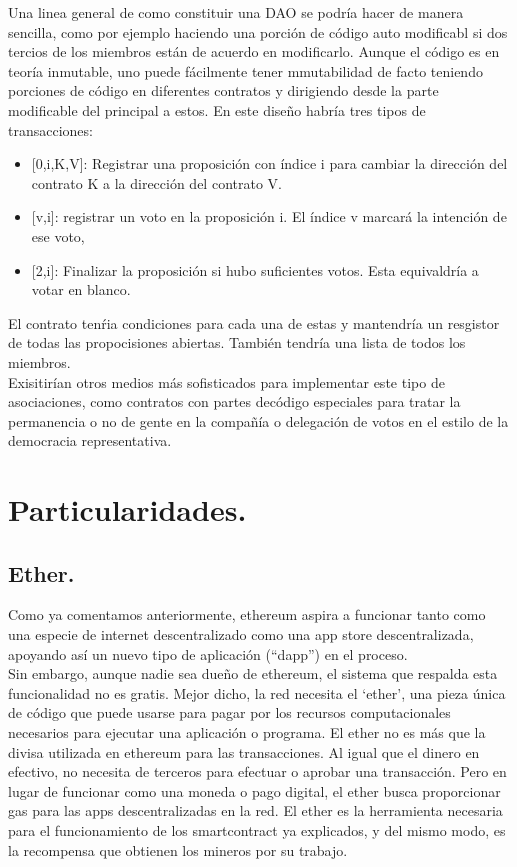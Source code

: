 \documentclass[11pt,a4paper]{article}
\begin{document}
Una linea general de como constituir una DAO se podría hacer de manera sencilla, como por ejemplo haciendo una porción de código auto modificabl si dos tercios de los miembros están de acuerdo en modificarlo. Aunque el código es en teoría inmutable, uno puede fácilmente tener mmutabilidad de facto teniendo porciones de código en diferentes contratos y dirigiendo desde la parte modificable del principal a estos. En este diseño habría tres tipos de transacciones:
\begin{itemize}
	\item {[0,i,K,V]}: Registrar una proposición con índice i para cambiar la dirección del contrato K a la dirección del contrato V.
	\item  {[v,i]}:  registrar un voto en la proposición i. El índice v marcará la intención de ese voto,   
	\item  {[2,i]}: Finalizar la proposición si hubo suficientes votos. Esta equivaldría a votar en blanco.
\end{itemize}

El contrato tenŕia condiciones para cada una de estas y mantendría un resgistor de todas las propocisiones abiertas.  También tendría una lista de todos los miembros.\\

Exisitirían otros medios más sofisticados para implementar este tipo de asociaciones, como contratos con partes decódigo especiales para tratar la permanencia o no de gente en la compañía o delegación de votos en el estilo de la democracia representativa.

\section{Particularidades.}

\subsection{Ether.}
\label{sec:ether}

Como ya comentamos anteriormente, ethereum aspira a funcionar tanto como una especie de
internet descentralizado como una app store descentralizada, apoyando así un nuevo tipo de aplicación (“dapp”) en el proceso.\\

Sin embargo, aunque nadie sea dueño de ethereum, el sistema que respalda esta funcionalidad no es gratis. Mejor dicho, la red necesita el ‘ether’, una pieza única de código que puede usarse para pagar por los recursos computacionales necesarios para ejecutar una aplicación o programa. El ether no es más que la divisa utilizada en ethereum para las transacciones. Al igual que el dinero en efectivo, no necesita de terceros para efectuar o aprobar una transacción. Pero en lugar de funcionar como una moneda o pago digital, el ether busca proporcionar gas para las apps descentralizadas en la red. El ether es la herramienta necesaria para el funcionamiento de los smartcontract ya explicados,  y del mismo modo, es la recompensa que obtienen los mineros por su trabajo.\\
\end{document}
